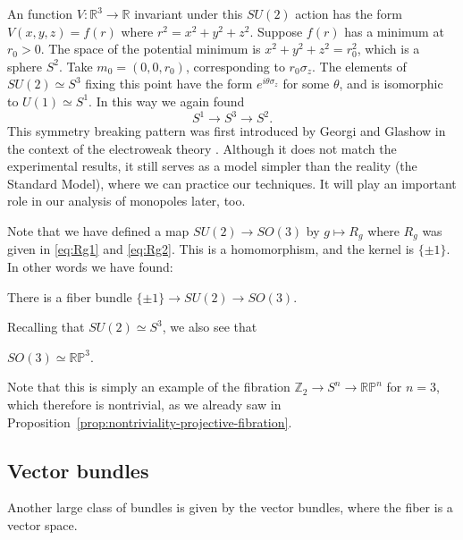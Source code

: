 \documentclass[12pt]{article}
\numberwithin{equation}{section}
\def\bR{\mathbb{R}}
\def\bZ{\mathbb{Z}}
\def\RP{\mathbb{RP}}
\begin{document}
An function $V:\bR^3\to \bR$ invariant under this $SU(2)$ action 
has the form $V(x,y,z)=f(r)$ where $r^2={x^2+y^2+z^2}$.
Suppose $f(r)$ has a minimum at $r_0>0$.
The space of the potential minimum is $x^2+y^2+z^2=r_0^2$, which is a sphere $S^2$.
Take $m_0=(0,0,r_0)$, corresponding to $r_0 \sigma_z$.
The elements of $SU(2)\simeq S^3$ fixing this point have the form $e^{i\theta \sigma_z}$ for some $\theta$,
and is isomorphic to $U(1)\simeq S^1$.
In this way we again found \begin{equation}
  S^1 \to S^3 \to S^2.
\end{equation}
This symmetry breaking pattern was first introduced by Georgi and Glashow in the context of the electroweak theory \cite{Georgi:1972cj}.
Although it does not match the experimental results,
it still serves as a model simpler than the reality (the Standard Model),
where we can practice our techniques. 
It will play an important role in our analysis of monopoles later, too.

Note that we have defined a map $SU(2)\to SO(3)$ by $g\mapsto R_g$ where $R_g$ was given in \eqref{eq:Rg1} and \eqref{eq:Rg2}.
This is a homomorphism, and the kernel is $\{\pm 1\}$.
In other words we have found:
\begin{example}
  There is a fiber bundle $
    \{\pm 1\} \to SU(2) \to SO(3). 
  $
\end{example}
Recalling that $SU(2)\simeq S^3$, we also see that 
\begin{proposition}
$SO(3)\simeq \RP^3$.  
\end{proposition}

Note that this is simply an example of the fibration $\bZ_2\to S^n\to \RP^n$
for $n=3$,
which therefore is nontrivial, as we already saw in Proposition~\ref{prop:nontriviality-projective-fibration}.

\subsection{Vector bundles}

Another large class of bundles is given by the vector bundles,
where the fiber is a vector space.
\end{document}
